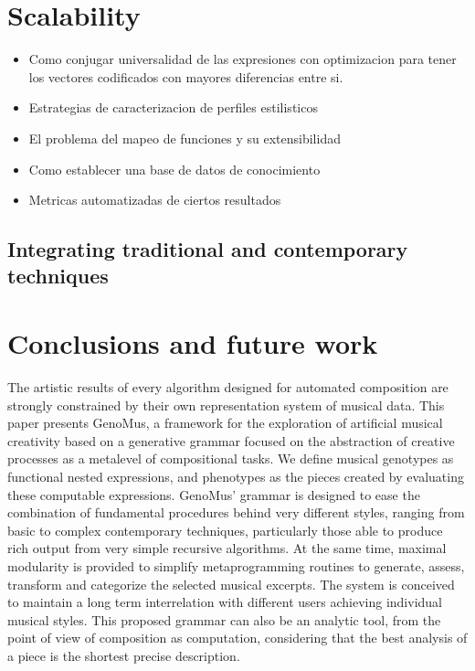 \documentclass{article}
\begin{document}
{\section{Scalability}
\begin{itemize}
\item Como conjugar universalidad de las expresiones con optimizacion para tener los vectores codificados con mayores diferencias entre si.
\item Estrategias de caracterizacion de perfiles estilisticos
\item El problema del mapeo de funciones y su extensibilidad
\item Como establecer una base de datos de conocimiento
\item Metricas automatizadas de ciertos resultados
\end{itemize}

\subsection{Integrating traditional and contemporary techniques}


\section{Conclusions and future work}

The artistic results of every algorithm designed for automated composition
are strongly constrained by their own representation
system of musical data. This paper presents GenoMus, a
framework for the exploration of artificial musical creativity
based on a generative grammar focused on the abstraction
of creative processes as a metalevel of compositional
tasks. We define musical genotypes as functional
nested expressions, and phenotypes as the pieces created
by evaluating these computable expressions. GenoMus' grammar is designed 
to ease the combination of fundamental procedures behind very different styles, ranging from basic to complex contemporary
techniques, particularly those able to produce rich
output from very simple recursive algorithms. At the same
time, maximal modularity is provided to simplify metaprogramming
routines to generate, assess, transform and categorize
the selected musical excerpts. The system is conceived
to maintain a long term interrelation with different
users achieving individual musical styles. This proposed
grammar can also be an analytic tool, from the point of
view of composition as computation, considering that the
best analysis of a piece is the shortest precise description.

}
\end{document}

